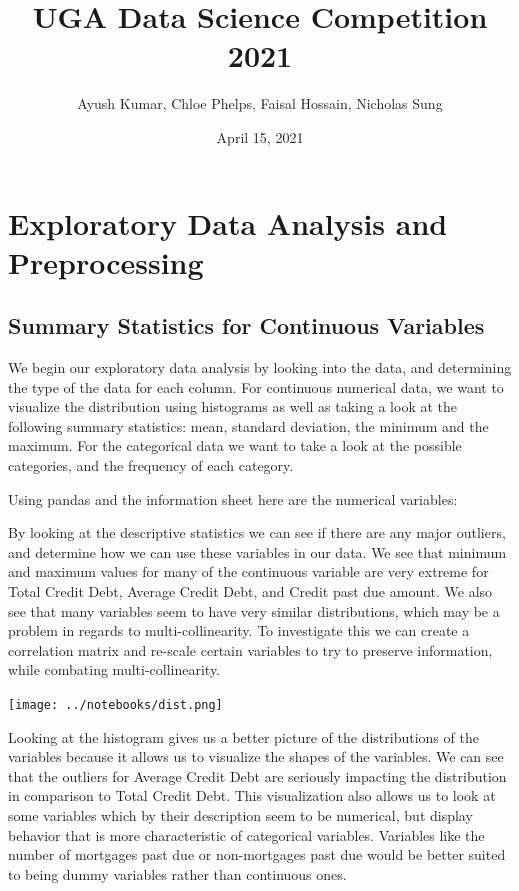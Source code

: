 \documentclass[12pt]{article}
\title{UGA Data Science Competition 2021}
\author{Ayush Kumar, Chloe Phelps, Faisal Hossain, Nicholas Sung}
\date{April 15, 2021}
\begin{document}
 
	
	\maketitle
	\tableofcontents
	\newpage
	
	\section{Exploratory Data Analysis and Preprocessing}
	
	\subsection{Summary Statistics for Continuous Variables}
	
	We begin our exploratory data analysis by looking into the data, and determining the type of the data for each column. For continuous numerical data, we want to visualize the distribution using histograms as well as taking a look at the following summary statistics: mean, standard deviation, the minimum and the maximum. For the categorical data we want to take a look at the possible categories, and the frequency of each category. 
	
	Using pandas and the information sheet here are the numerical variables: 
	

	
	
	By looking at the descriptive statistics we can see if there are any major outliers, and determine how we can use these variables in our data. We see that minimum and maximum values for many of the continuous variable are very extreme for Total Credit Debt, Average Credit Debt, and Credit past due amount. We also see that many variables seem to have very similar distributions, which may be a problem in regards to multi-collinearity. To investigate this we can create a correlation matrix and re-scale certain variables to try to preserve information, while combating multi-collinearity. 
	
	\begin{center}
			\texttt{[image: ../notebooks/dist.png]}
	\end{center}


	Looking at the histogram gives us a better picture of the distributions of the variables because it allows us to visualize the shapes of the variables. We can see that the outliers for Average Credit Debt are seriously impacting the distribution in comparison to Total Credit Debt. This visualization also allows us to look at some variables which by their description seem to be numerical, but display behavior that is more characteristic of categorical variables. Variables like the number of mortgages past due or non-mortgages past due would be better suited to being dummy variables rather than continuous ones. 
	
\end{document}
